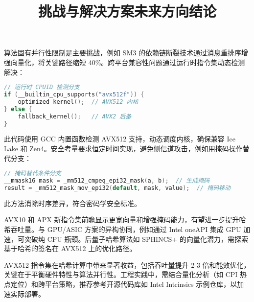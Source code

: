 \title{挑战与解决方案}
算法固有并行性限制是主要挑战，例如 SM3 的依赖链断裂技术通过消息重排序增强向量化，将关键路径缩短 40\%{}。跨平台兼容性问题通过运行时指令集动态检测解决：\par
\begin{lstlisting}[language=c]
// 运行时 CPUID 检测分支
if (__builtin_cpu_supports("avx512f")) {
    optimized_kernel();  // AVX512 内核
} else {
    fallback_kernel();   // AVX2 后备
}
\end{lstlisting}
此代码使用 GCC 内置函数检测 AVX512 支持，动态调度内核，确保兼容 Ice Lake 和 Zen4。安全考量要求恒定时间实现，避免侧信道攻击，例如用掩码操作替代分支：\par
\begin{lstlisting}[language=c]
// 掩码替代条件分支
__mmask16 mask = _mm512_cmpeq_epi32_mask(a, b);  // 生成掩码
result = _mm512_mask_mov_epi32(default, mask, value);  // 掩码移动
\end{lstlisting}
此方法消除时序差异，符合密码学安全标准。\par
\title{未来方向}
AVX10 和 APX 新指令集前瞻显示更宽向量和增强掩码能力，有望进一步提升哈希吞吐量。与 GPU/ASIC 方案的异构协同，例如通过 Intel oneAPI 集成 GPU 加速，可突破纯 CPU 瓶颈。后量子哈希算法如 SPHINCS+ 的向量化潜力，需探索基于哈希的签名在 AVX512 上的优化路径。\par
\title{结论}
AVX512 指令集在哈希计算中带来显著收益，包括吞吐量提升 2-3 倍和能效优化，关键在于平衡硬件特性与算法并行性。工程实践中，需结合量化分析（如 CPI 热点定位）和跨平台策略，推荐参考开源代码库如 Intel Intrinsics 示例仓库，以加速实际部署。\par
